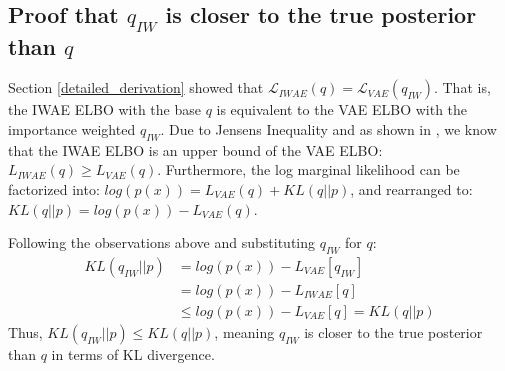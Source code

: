 \documentclass{article} %
\begin{document}



\subsection{Proof that \texorpdfstring{$q_{IW}$}{} is closer to the true posterior than \texorpdfstring{$q$}{}}

Section \ref{detailed_derivation} showed that $\mathcal{L}_{IWAE}(q) = \mathcal{L}_{VAE}(q_{IW})$. That is, the IWAE ELBO with the base $q$ is equivalent to the VAE ELBO with the importance weighted $q_{IW}$. Due to Jensen\textquotesingle s Inequality and as shown in \cite{burda2015importance}, we know that the IWAE ELBO is an upper bound of the VAE ELBO: ${L}_{IWAE}(q) \geq {L}_{VAE}(q)$. Furthermore, the log marginal likelihood can be factorized into: $log(p(x)) = {L}_{VAE}(q) + KL(q||p)$, and rearranged to: $KL(q||p) = log(p(x)) - {L}_{VAE}(q)$.

Following the observations above and substituting $q_{IW}$ for $q$:
\begin{align} 
    KL(q_{IW}||p) &= log(p(x)) - {L}_{VAE}[q_{IW}] \\
    &= log(p(x)) - {L}_{IWAE}[q] \\
    &\leq log(p(x)) - {L}_{VAE}[q] = KL(q||p)
\end{align}
Thus, $KL(q_{IW}||p) \leq KL(q||p)$, meaning $q_{IW}$ is closer to the true posterior than $q$ in terms of KL divergence. 
\end{document}
